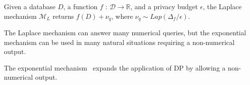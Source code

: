 
\begin{definition}\label{def:LM}
Given a database $D$, a function $f$ : $\mathcal{D} \rightarrow \mathbb{R}$, and a privacy budget $\epsilon$, the Laplace mechanism $\mathcal{M}_L$ returns $f(D) + \nu_q$, where $\nu_q\sim Lap(\Delta_f/\epsilon)$. 
\end{definition}

The Laplace mechanism can answer many numerical queries, but the exponential mechanism can be used in many natural situations requiring a non-numerical output. 


 The exponential mechanism~\cite{mcsherry2007mechanism} expands the application of DP by allowing a non-numerical output. %


